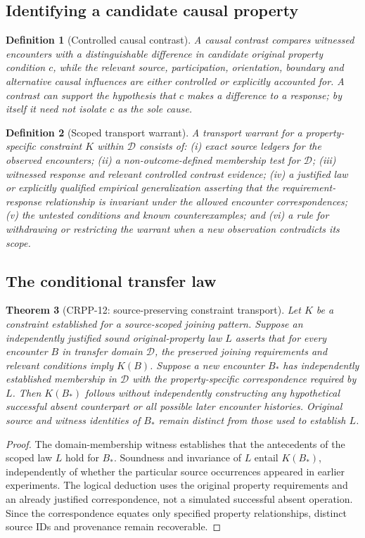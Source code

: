 \documentclass[11pt]{article}
\newtheorem{definition}{Definition}[section]
\newtheorem{theorem}[definition]{Theorem}
\begin{document}
\subsection{Identifying a candidate causal property}
\begin{definition}[Controlled causal contrast]
A causal contrast compares witnessed encounters with
a distinguishable difference in candidate original
property condition $c$, while the relevant source,
participation, orientation, boundary and alternative
causal influences are either controlled or explicitly
accounted for. A contrast can support the hypothesis
that $c$ makes a difference to a response; by itself
it need not isolate $c$ as the sole cause.
\end{definition}

\begin{definition}[Scoped transport warrant]
A transport warrant for a property-specific constraint $K$
within $\mathcal D$ consists of: (i) exact source ledgers
for the observed encounters; (ii) a non-outcome-defined
membership test for $\mathcal D$; (iii) witnessed response
and relevant controlled contrast evidence; (iv) a justified
law or explicitly qualified empirical generalization
asserting that the requirement-response relationship
is invariant under the allowed encounter correspondences;
(v) the untested conditions and known counterexamples;
and (vi) a rule for withdrawing or restricting the
warrant when a new observation contradicts its scope.
\end{definition}

\subsection{The conditional transfer law}
\begin{theorem}[CRPP-12: source-preserving constraint transport]
Let $K$ be a constraint established for a source-scoped
joining pattern. Suppose an independently justified
sound original-property law $L$ asserts that for every
encounter $B$ in transfer domain $\mathcal D$, the
preserved joining requirements and relevant conditions
imply $K(B)$. Suppose a new encounter $B_*$ has
independently established membership in $\mathcal D$
with the property-specific correspondence required by
$L$. Then $K(B_*)$ follows without independently
constructing any hypothetical successful absent
counterpart or all possible later encounter histories.
Original source and witness identities of $B_*$
remain distinct from those used to establish $L$.
\end{theorem}
\begin{proof}
The domain-membership witness establishes that the
antecedents of the scoped law $L$ hold for $B_*$.
Soundness and invariance of $L$ entail $K(B_*)$,
independently of whether the particular source
occurrences appeared in earlier experiments.
The logical deduction uses the original property
requirements and an already justified correspondence,
not a simulated successful absent operation. Since
the correspondence equates only specified
property relationships, distinct source IDs and
provenance remain recoverable.
\end{proof}
\end{document}
